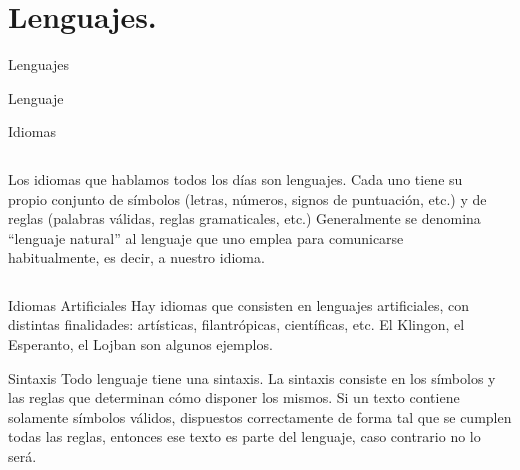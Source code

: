 \section{Lenguajes.}


\begin{frame}{Lenguajes}
	\begin{block}{Lenguaje}
	\end{block}
\end{frame}


\begin{frame}{Idiomas}
  \begin{columns}
    \begin{column}{0.46\textwidth}
      Los idiomas que hablamos todos los días son lenguajes.
      \jump
      Cada uno tiene su propio conjunto de símbolos (letras, números, signos de
      puntuación, etc.) y de reglas (palabras válidas, reglas gramaticales, etc.)
      \jump
      Generalmente se denomina “lenguaje natural” al lenguaje que uno emplea para
      comunicarse habitualmente, es decir, a nuestro idioma.
    \end{column}

    \begin{column}{0.46\textwidth}
    \end{column}
  \end{columns}
\end{frame}


\begin{frame}{Idiomas Artificiales}
  Hay idiomas que consisten en lenguajes artificiales, con distintas finalidades:
  artísticas, filantrópicas, científicas, etc.
  \jump
  El Klingon, el Esperanto, el Lojban son algunos ejemplos.
  \jump
\end{frame}


\begin{frame}{Sintaxis}
  Todo lenguaje tiene una sintaxis.
  \jump
  La sintaxis consiste en los símbolos y las reglas que determinan cómo disponer
  los mismos.
  \jump
  Si un texto contiene solamente símbolos válidos, dispuestos correctamente de
  forma tal que se cumplen todas las reglas, entonces ese texto es parte del lenguaje,
  caso contrario no lo será.
\end{frame}

